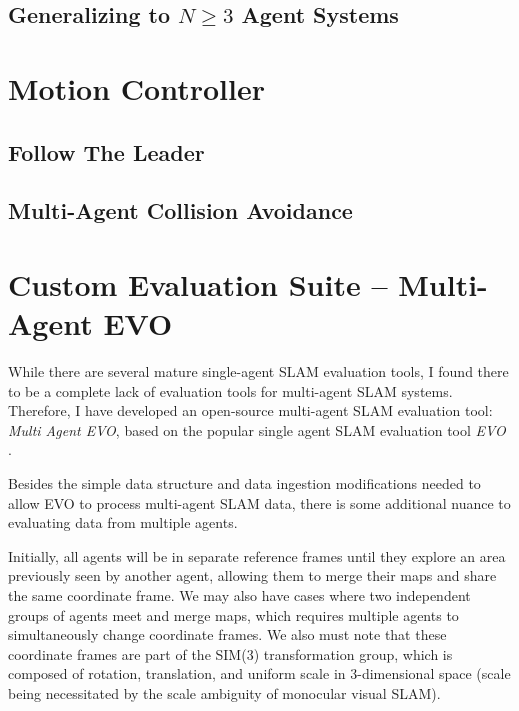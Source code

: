 \subsection{Generalizing to $N \geq 3$ Agent Systems}
\label{sec:generalizing-to-n-2-agent-systems}

\section{Motion Controller}
\label{sec:motion-controller}

\subsection{Follow The Leader}
\label{sec:follow-the-leader}

\subsection{Multi-Agent Collision Avoidance}
\label{sec:multi-agent-collision-avoidance}

\section{Custom Evaluation Suite – Multi-Agent EVO}
\label{sec:multi-agent-evo}
While there are several mature single-agent SLAM evaluation tools, I found there to be a complete lack of evaluation tools for multi-agent SLAM systems. Therefore, I have developed an open-source multi-agent SLAM evaluation tool: \textit{Multi Agent EVO}, based on the popular single agent SLAM evaluation tool \textit{EVO} \autocite{grupp2017evo}.

Besides the simple data structure and data ingestion modifications needed to allow EVO to process multi-agent SLAM data, there is some additional nuance to evaluating data from multiple agents.

Initially, all agents will be in separate reference frames until they explore an area previously seen by another agent, allowing them to merge their maps and share the same coordinate frame. We may also have cases where two independent groups of agents meet and merge maps, which requires multiple agents to simultaneously change coordinate frames. We also must note that these coordinate frames are part of the SIM(3) transformation group, which is composed of rotation, translation, and uniform scale in 3-dimensional space (scale being necessitated by the scale ambiguity of monocular visual SLAM).

